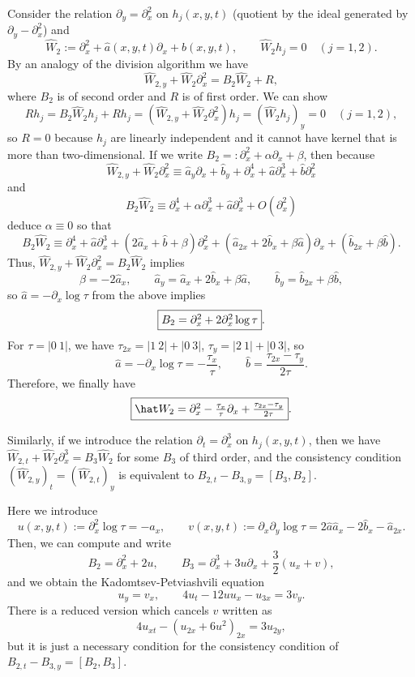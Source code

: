 \documentclass{../../../small}
\begin{document}
Consider the relation $\partial_y=\partial_x^2$ on $h_j(x,y,t)$ (quotient by the ideal generated by $\partial_y-\partial_x^2$) and
\[\hat W_2:=\partial_x^2+\hat a(x,y,t)\partial_x+\hat b(x,y,t),\qquad \hat W_2h_j=0\quad(j=1,2).\]
By an analogy of the division algorithm we have
\[\hat W_{2,y}+\hat W_2\partial_x^2=B_2\hat W_2+R,\]
where $B_2$ is of second order and $R$ is of first order.
We can show
\[Rh_j=B_2\hat W_2h_j+Rh_j=(\hat W_{2,y}+\hat W_2\partial_x^2)h_j=(\hat W_2h_j)_y=0\quad(j=1,2),\]
so $R=0$ because $h_j$ are linearly independent and it cannot have kernel that is more than two-dimensional.
If we write $B_2=:\partial_x^2+\alpha\partial_x+\beta$, then because
\[\hat W_{2,y}+\hat W_2\partial_x^2\equiv\hat a_y\partial_x+\hat b_y+\partial_x^4+\hat a\partial_x^3+\hat b\partial_x^2\]
and
\[B_2\hat W_2\equiv\partial_x^4+\alpha\partial_x^3+\hat a\partial_x^3+O(\partial_x^2)\]
deduce $\alpha\equiv0$ so that
\[B_2\hat W_2\equiv\partial_x^4+\hat a\partial_x^3+(2\hat a_x+\hat b+\beta)\partial_x^2+(\hat a_{2x}+2\hat b_x+\beta\hat a)\partial_x+(\hat b_{2x}+\beta\hat b).\]
Thus, $\hat W_{2,y}+\hat W_2\partial_x^2=B_2\hat W_2$ implies
\[\beta=-2\hat a_x,\qquad\hat a_y=\hat a_x+2\hat b_x+\beta\hat a,\qquad\hat b_y=\hat b_{2x}+\beta\hat b,\]
so $\hat a=-\partial_x\log\tau$ from the above implies
\[\fbox{$B_2=\partial_x^2+2\partial_x^2\log\tau$}.\]
For $\tau=|0\ 1|$, we have $\tau_{2x}=|1\ 2|+|0\ 3|$, $\tau_y=|2\ 1|+|0\ 3|$, so
\[\hat a=-\partial_x\log\tau=-\frac{\tau_x}\tau,\qquad\hat b=\frac{\tau_{2x}-\tau_y}{2\tau}.\]
Therefore, we finally have
\[\fbox{$\hat W_2=\partial_x^2-\frac{\tau_x}\tau\partial_x+\frac{\tau_{2x}-\tau_y}{2\tau}$}.\]

Similarly, if we introduce the relation $\partial_t=\partial_x^3$ on $h_j(x,y,t)$, then we have $\hat W_{2,t}+\hat W_2\partial_x^3=B_3\hat W_2$ for some $B_3$ of third order, and the consistency condition $(\hat W_{2,y})_t=(\hat W_{2,t})_y$ is equivalent to $B_{2,t}-B_{3,y}=[B_3,B_2]$.

Here we introduce
\[u(x,y,t):=\partial_x^2\log\tau=-\hat a_x,\qquad v(x,y,t):=\partial_x\partial_y\log\tau=2\hat a\hat a_x-2\hat b_x-\hat a_{2x}.\]
Then, we can compute and write
\[B_2=\partial_x^2+2u,\qquad B_3=\partial_x^3+3u\partial_x+\frac32(u_x+v),\]
and we obtain the Kadomtsev-Petviashvili equation
\[u_y=v_x,\qquad 4u_t-12uu_x-u_{3x}=3v_y.\]
There is a reduced version which cancels $v$ written as
\[4u_{xt}-(u_{2x}+6u^2)_{2x}=3u_{2y},\]
but it is just a necessary condition for the consistency condition of $B_{2,t}-B_{3,y}=[B_2,B_3]$.
\end{document}
